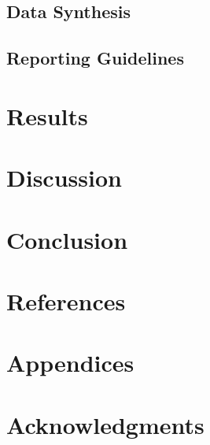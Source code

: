 \documentclass{article}
\begin{document}
    \subsection{Data Synthesis}

    \subsection{Reporting Guidelines}

\newpage
\section{Results}

\newpage
\section{Discussion}

\newpage
\section{Conclusion}

\newpage
\section{References}

\section{Appendices}

\section{Acknowledgments}
\end{document}
